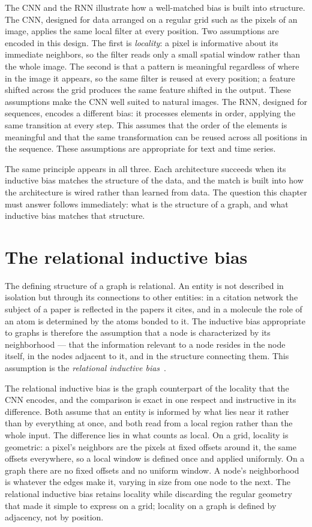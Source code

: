 The CNN and the RNN illustrate how a well-matched bias is built into
structure. The CNN, designed for data arranged on a regular grid such as the
pixels of an image, applies the same local filter at every position. Two
assumptions are encoded in this design. The first is \textit{locality}: a pixel
is informative about its immediate neighbors, so the filter reads only a small
spatial window rather than the whole image. The second is that a pattern is
meaningful regardless of where in the image it appears, so the same filter is
reused at every position; a feature shifted across the grid produces the same
feature shifted in the output. These assumptions make the CNN well suited to 
natural images. The RNN, designed for sequences,
encodes a different bias: it processes elements in order, applying the same
transition at every step. This assumes that the order of the
elements is meaningful and that the same transformation can be reused across
all positions in the sequence. These assumptions are appropriate for text and time series.

The same principle appears in all three. Each architecture succeeds when its
inductive bias matches the structure of the data, and the match is built into how
the architecture is wired rather than learned from data. The question
this chapter must answer follows immediately: what is the structure of a graph,
and what inductive bias matches that structure.

\section{The relational inductive bias}
\label{sec:relational-bias}

The defining structure of a graph is relational. An entity is not described in
isolation but through its connections to other entities: in a citation network
the subject of a paper is reflected in the papers it cites, and in a molecule
the role of an atom is determined by the atoms bonded to it. The inductive bias
appropriate to graphs is therefore the assumption that a node is characterized
by its neighborhood --- that the information relevant to a node resides in the node itself,
in the nodes adjacent to it, and in the structure connecting them. This assumption is
the \textit{relational inductive bias}~\cite[-7.5pc]{battaglia2018}.

The relational inductive bias is the graph counterpart of the locality that the CNN encodes,
and the comparison is exact in one respect and instructive in its difference. Both assume
that an entity is informed by what lies near it rather than by everything at once,
and both read from a local region rather than the whole input. The difference lies in what
counts as local. On a grid, locality is geometric: a pixel's neighbors are the pixels at fixed
offsets around it, the same offsets everywhere, so a local window is defined once and
applied uniformly. On a graph there are no fixed offsets and no uniform window.
A node's neighborhood is whatever the edges make it, varying in size from one node to
the next. The relational inductive bias retains locality while discarding the regular geometry
that made it simple to express on a grid; locality on a graph is
defined by adjacency, not by position.

